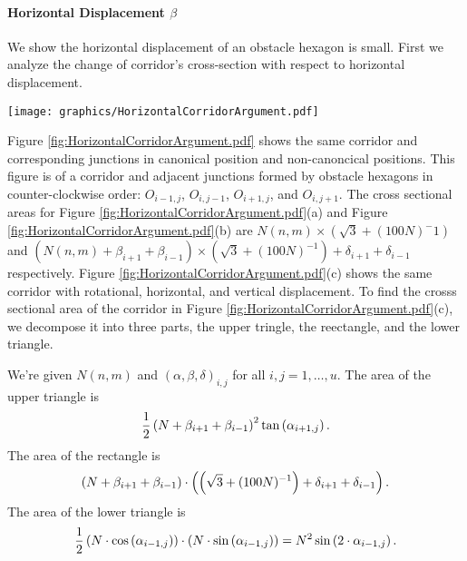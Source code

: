 \paragraph{Horizontal Displacement $\beta$}

We show the horizontal displacement of an obstacle hexagon is small.
First we analyze the change of corridor's cross-section with respect to horizontal displacement.

\begin{minipage}{\linewidth}
\begin{center}
\texttt{[image: graphics/HorizontalCorridorArgument.pdf]}
\label{fig:HorizontalCorridorArgument.pdf}
\end{center}
\end{minipage}
Figure \ref{fig:HorizontalCorridorArgument.pdf} shows the same corridor and corresponding junctions in canonical position and non-canoncical positions.
This figure is of a corridor and adjacent junctions formed by obstacle hexagons in counter-clockwise order: $O_{i-1,j}$, $O_{i,j-1}$, $O_{i+1,j}$, and $O_{i,j+1}$.
The cross sectional areas for Figure \ref{fig:HorizontalCorridorArgument.pdf}(a) and Figure \ref{fig:HorizontalCorridorArgument.pdf}(b) are $N(n,m) \times (\sqrt{3} + (100N)^-1)$ and $(N(n,m) + \beta_{i+1} + \beta_{i-1}) \times (\sqrt{3} + (100N)^{-1}) + \delta_{i+1} + \delta_{i-1}$ respectively.  
Figure \ref{fig:HorizontalCorridorArgument.pdf}(c) shows the same corridor with rotational, horizontal, and vertical displacement.
To find the crosss sectional area of the corridor in Figure \ref{fig:HorizontalCorridorArgument.pdf}(c), we decompose it into three parts, the upper tringle, the reectangle, and the lower triangle.  

We're given $N(n,m)$ and $(\alpha, \beta, \delta)_{i,j}$ for all $i,j = 1, \dots, u$. 
The area of the upper triangle is 
\begin{equation}\label{eqn:upperTriangle}
\frac{1}{2}\left( N+\beta_{i+1} + \beta_{i-1} \right)^2 \tan \left( \alpha_{i+1,j} \right).
\end{equation}
The area of the rectangle is 
\begin{equation}\label{eqn:rectangle}
\left( N + \beta_{i+1} + \beta_{i-1} \right) \cdot \left( \left( \sqrt{3} + (100N)^{-1} \right) + \delta_{i+1} + \delta_{i-1} \right).
\end{equation}
The area of the lower triangle is 
\begin{equation}\label{eqn:lowerTriangle}
\frac{1}{2} \left( N \cdot \cos \left(  \alpha_{i-1,j}  \right)  \right) \cdot \left( N \cdot \sin \left( \alpha_{i-1,j} \right)  \right)= N^2 \sin \left( 2 \cdot \alpha_{i-1,j} \right).
\end{equation}




